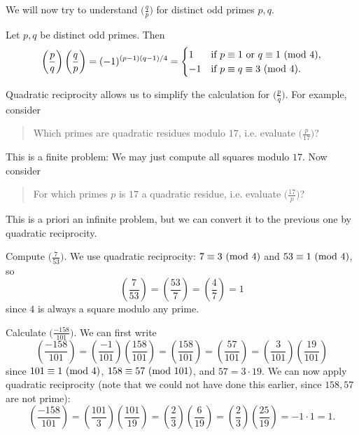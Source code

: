 \begin{remark}
  We will now try to understand
  $\big(\frac{q}{p}\big)$ for distinct
  odd primes $p, q$.
\end{remark}

\begin{theorem}\label{thm:quadratic-reciprocity}
  Let $p, q$ be distinct odd primes. Then
  \[
    \left(\frac{p}{q}\right)
    \left(\frac{q}{p}\right)
    = (-1)^{(p - 1)(q - 1) / 4}
    =
    \begin{cases}
      1 & \text{if } p \equiv 1 \text{ or } q \equiv 1 \ (\mathrm{mod}\ 4), \\
      -1 & \text{if } p \equiv q \equiv 3 \ (\mathrm{mod}\ 4).
    \end{cases}
  \]
\end{theorem}

\begin{remark}
  Quadratic reciprocity allows us to
  simplify the calculation for
  $\big(\frac{p}{q}\big)$.
  For example, consider
  \begin{quote}
    Which primes are quadratic residues modulo
    $17$, i.e. evaluate $\big(\frac{p}{17}\big)$?
  \end{quote}
  This is a finite problem: We may just
  compute all squares modulo $17$.
  Now consider
  \begin{quote}
    For which primes $p$ is $17$ a
    quadratic residue, i.e. evaluate
    $\big(\frac{17}{p}\big)$?
  \end{quote}
  This is a priori an infinite problem,
  but we can convert it to the previous one
  by quadratic reciprocity.
\end{remark}

\begin{example}
  Compute $\big(\frac{7}{53}\big)$.
  We use quadratic reciprocity:
  $7 \equiv 3 \ (\mathrm{mod}\ 4)$ and
  $53 \equiv 1 \ (\mathrm{mod}\ 4)$, so
  \[
    \left(\frac{7}{53}\right)
    =
    \left(\frac{53}{7}\right)
    =
    \left(\frac{4}{7}\right)
    = 1
  \]
  since $4$ is always a square modulo any
  prime.
\end{example}

\begin{example}
  Calculate $\big(\frac{-158}{101}\big)$.
  We can first write
  \[
    \left(\frac{-158}{101}\right)
    = \left(\frac{-1}{101}\right)
    \left(\frac{158}{101}\right)
    = \left(\frac{158}{101}\right)
    = \left(\frac{57}{101}\right)
    = \left(\frac{3}{101}\right)
    \left(\frac{19}{101}\right)
  \]
  since $101 \equiv 1 \ (\mathrm{mod}\ 4)$,
  $158 \equiv 57 \ (\mathrm{mod}\ 101)$, and
  $57 = 3 \cdot 19$. We can now
  apply quadratic reciprocity (note that
  we could not have done this earlier,
  since $158, 57$ are not prime):
  \[
    \left(\frac{-158}{101}\right)
    = \left(\frac{101}{3}\right)
    \left(\frac{101}{19}\right)
    = \left(\frac{2}{3}\right)
    \left(\frac{6}{19}\right)
    = \left(\frac{2}{3}\right)\left(\frac{25}{19}\right)
    = -1 \cdot 1 = 1.
  \]
\end{example}

